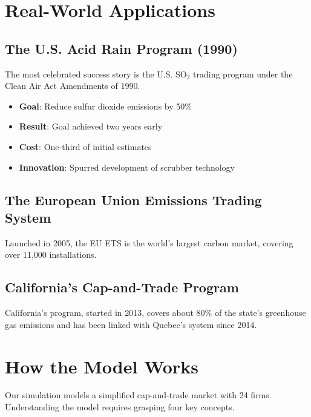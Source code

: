 \documentclass{tufte-handout}\usepackage[]{graphicx}\usepackage[]{xcolor}
\begin{document}
\section{Real-World Applications}

\subsection{The U.S. Acid Rain Program (1990)}

The most celebrated success story is the U.S. SO$_2$ trading program under the Clean Air Act Amendments of 1990.

\begin{itemize}
\item \textbf{Goal}: Reduce sulfur dioxide emissions by 50\%
\item \textbf{Result}: Goal achieved two years early
\item \textbf{Cost}: One-third of initial estimates
\item \textbf{Innovation}: Spurred development of scrubber technology
\end{itemize}

\subsection{The European Union Emissions Trading System}

Launched in 2005, the EU ETS is the world's largest carbon market, covering over 11,000 installations.

\subsection{California's Cap-and-Trade Program}

California's program, started in 2013, covers about 80\% of the state's greenhouse gas emissions and has been linked with Quebec's system since 2014.

\section{How the Model Works}

Our simulation models a simplified cap-and-trade market with 24 firms. Understanding the model requires grasping four key concepts.
\end{document}
